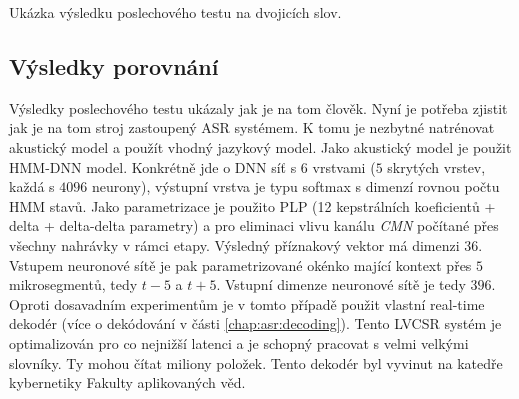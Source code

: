\begin{table}[htpb]
  \centering
  \def\arraystretch{1.5}
  \caption{Ukázka výsledku poslechového testu na dvojicích slov.}
  \label{tab:realisation:listening:bigrams}
\end{table}

\subsection{Výsledky porovnání}
\label{chap:realisation:comparison}

Výsledky poslechového testu ukázaly jak je na tom člověk. Nyní je potřeba zjistit jak je na tom stroj zastoupený ASR systémem. K tomu je nezbytné natrénovat akustický model a použít vhodný jazykový model. Jako akustický model je použit HMM-DNN model. Konkrétně jde o DNN síť s $6$ vrstvami ($5$ skrytých vrstev, každá s $4096$ neurony), výstupní vrstva je typu softmax s dimenzí rovnou počtu HMM stavů. Jako parametrizace je použito PLP (12 kepstrálních koeficientů + delta + delta-delta parametry) a pro eliminaci vlivu kanálu \textit{CMN} počítané přes všechny nahrávky v rámci etapy. Výsledný příznakový vektor má dimenzi $36$. Vstupem neuronové sítě je pak parametrizované okénko mající kontext přes $5$ mikrosegmentů, tedy $t-5$ a $t+5$. Vstupní dimenze neuronové sítě je tedy $396$. Oproti dosavadním experimentům je v tomto případě použit vlastní real-time dekodér (více o dekódování v části \ref{chap:asr:decoding}). Tento LVCSR systém je optimalizován pro co nejnižší latenci a je schopný pracovat s velmi velkými slovníky. Ty mohou čítat miliony položek. Tento dekodér byl vyvinut na katedře kybernetiky Fakulty aplikovaných věd.

